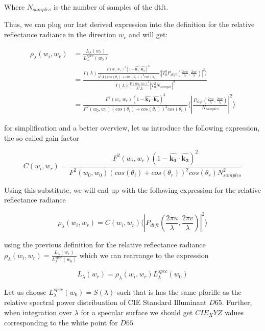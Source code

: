 Where $N_{samples}$ is the number of samples of the dtft.

Thus, we can plug our last derived expression into the definition for the relative reflectance radiance in the direction $w_r$ and will get:

\begin{align*}
\rho_\lambda(w_i,w_r)
& = \frac{L_\lambda(w_r)}{L_\lambda^{spec}(w_0)} \\
& = \frac{I(\lambda) \frac{F(w_i, w_r)^2 (1-\hat{\mathbf{k_1}}\cdot\hat{\mathbf{k_2}})^2}{\lambda^2 A (cos(\theta_i)+cos(\theta_r))^2 cos(\theta_r)} \langle \left|T_0^2 P_{dtft}(\frac{2\pi u}{\lambda}, \frac{2\pi v}{\lambda})  \right|^2\rangle}{I(\lambda) \frac{F(w_0, w_0)^2}{\lambda^2 A}\left| T_0^2 N_{sample} \right|^2 } \\
& = \frac{F^2(w_i,w_r)(1-\hat{\mathbf{k_1}}\cdot\hat{\mathbf{k_2}})^2}{F^2(w_0,w_0)(cos(\theta_i)+cos(\theta_r))^2 cos(\theta_r)}  \langle \left|\frac{P_{dtft}(\frac{2\pi u}{\lambda}, \frac{2\pi v}{\lambda})}{N_{samples}}\right|^2\rangle
\end{align*}

for simplification and a better overview, let us introduce the following expression, the so called gain factor

\begin{equation} \label{eq:cfact}
    C(w_i,w_r) = \frac{F^2(w_i,w_r)(1-\hat{\mathbf{k_1}}\cdot\hat{\mathbf{k_2}})^2}{F^2(w_0,w_0)(cos(\theta_i)+cos(\theta_r))^2 cos(\theta_r) N_{samples}^2}
\end{equation}

Using this substitute, we will end up with the following expression for the relative reflectance radiance

\begin{equation}
\rho_\lambda(w_i,w_r) =  C(w_i,w_r) \langle \left|P_{dtft}(\frac{2\pi u}{\lambda}, \frac{2\pi v}{\lambda})\right|^2\rangle
\end{equation}

using the previous definition for the relative reflectance radiance $\rho_\lambda(w_i,w_r) = \frac{L_\lambda(w_r)}{L_\lambda^{spec}(w_0)}$ which we can rearrange to the expression 

\begin{equation}
L_\lambda(w_r) = \rho_\lambda(w_i,w_r)L_\lambda^{spec}(w_0)
\end{equation}

Let us choose $L_\lambda^{spec}(w_0) = S(\lambda)$ such that is has the same pforifle as the relative spectral power distribuation of CIE Standard Illuminant $D65$. Further, when integration over $\lambda$ for a specular surface we should get $CIE_XYZ$ values corresponding to the white point for $D65$ 

